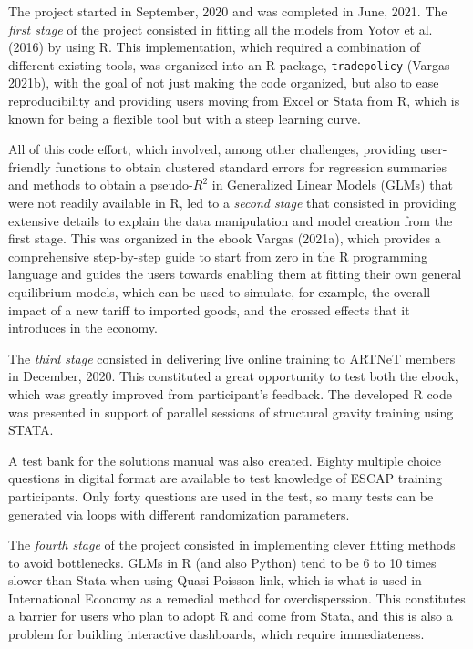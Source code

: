 \documentclass[12pt,reqno,oneside,pdftex]{formato-puc/puctesis} %
\begin{document}
The project started in September, 2020 and was completed in June, 2021.
The \emph{first stage} of the project consisted in fitting all the
models from Yotov et al. (2016) by using R. This implementation, which
required a combination of different existing tools, was organized into
an R package, \texttt{tradepolicy} (Vargas 2021b), with the goal of not
just making the code organized, but also to ease reproducibility and
providing users moving from Excel or Stata from R, which is known for
being a flexible tool but with a steep learning curve.

All of this code effort, which involved, among other challenges,
providing user-friendly functions to obtain clustered standard errors
for regression summaries and methods to obtain a pseudo-\(R^2\) in
Generalized Linear Models (GLMs) that were not readily available in R,
led to a \emph{second stage} that consisted in providing extensive
details to explain the data manipulation and model creation from the
first stage. This was organized in the ebook Vargas (2021a), which
provides a comprehensive step-by-step guide to start from zero in the R
programming language and guides the users towards enabling them at
fitting their own general equilibrium models, which can be used to
simulate, for example, the overall impact of a new tariff to imported
goods, and the crossed effects that it introduces in the economy.

The \emph{third stage} consisted in delivering live online training to
ARTNeT members in December, 2020. This constituted a great opportunity
to test both the ebook, which was greatly improved from participant's
feedback. The developed R code was presented in support of parallel
sessions of structural gravity training using STATA.

A test bank for the solutions manual was also created. Eighty multiple
choice questions in digital format are available to test knowledge of
ESCAP training participants. Only forty questions are used in the test,
so many tests can be generated via loops with different randomization
parameters.

The \emph{fourth stage} of the project consisted in implementing clever
fitting methods to avoid bottlenecks. GLMs in R (and also Python) tend
to be 6 to 10 times slower than Stata when using Quasi-Poisson link,
which is what is used in International Economy as a remedial method for
overdisperssion. This constitutes a barrier for users who plan to adopt
R and come from Stata, and this is also a problem for building
interactive dashboards, which require immediateness.
\end{document}
